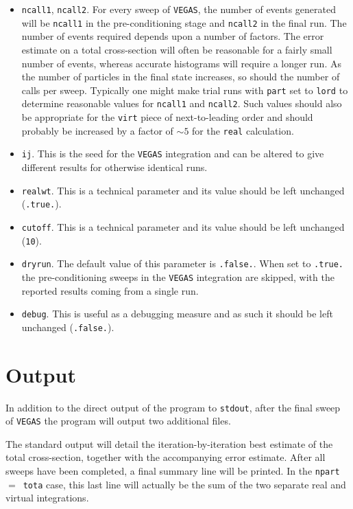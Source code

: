 \documentclass[12pt]{article}
\begin{document}
\begin{itemize}
\item {\tt ncall1}, {\tt ncall2}. For every sweep of {\tt VEGAS},
the number of events generated will be {\tt ncall1} in the
pre-conditioning stage and {\tt ncall2} in the final run. The number
of events required depends upon a number of factors. The error
estimate on a total cross-section will often be reasonable for a
fairly small number of events, whereas accurate histograms will
require a longer run. As the number of particles in the final state
increases, so should the number of calls per sweep. Typically one
might make trial runs with {\tt part} set to {\tt lord} to determine
reasonable values for {\tt ncall1} and {\tt ncall2}. Such values
should also be appropriate for the {\tt virt} piece of
next-to-leading order and should probably be increased by a factor of
$\sim 5$ for the {\tt real} calculation.

\item {\tt ij}. This is the seed for the {\tt VEGAS} integration
and can be altered to give different results for otherwise identical
runs.

\item {\tt realwt}. This is a technical parameter and its value
should be left unchanged ({\tt .true.}).

\item {\tt cutoff}. This is a technical parameter and its value
should be left unchanged ({\tt 10}).

\item {\tt dryrun}. The default value of this parameter is
{\tt .false.}. When set to {\tt .true.} the pre-conditioning sweeps
in the {\tt VEGAS} integration are skipped, with the reported
results coming from a single run.

\item {\tt debug}. This is useful as a debugging measure and as
such it should be left unchanged ({\tt .false.}).

\end{itemize}

\section{Output}
 
In addition to the direct output of the program to {\tt stdout}, after
the final sweep of {\tt VEGAS} the program will output two additional files.

The standard output will detail the iteration-by-iteration best estimate
of the total cross-section, together with the accompanying error estimate.
After all sweeps have been completed, a final summary line will be printed.
In the {\tt npart}~$=$~{\tt tota} case, this last line will actually be the
sum of the two separate real and virtual integrations.
\end{document}
